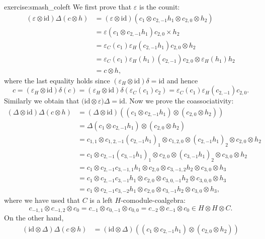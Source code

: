 \begin{sol}{exercise:smash_coleft}
We first prove that $\varepsilon$ is the counit:
\begin{align*}
(\varepsilon\otimes\textrm{id})\Delta(c\otimes h) & =(\varepsilon\otimes\textrm{id})(c_{1}\otimes c_{2,-1}h_{1}\otimes c_{2,0}\otimes h_{2})\\
 & =\varepsilon(c_{1}\otimes c_{2,-1}h_{1})c_{2,0}\times h_{2}\\
 & =\varepsilon_{C}(c_{1})\varepsilon_{H}(c_{2,-1}h_{1})c_{2,0}\otimes h_{2}\\
 & =\varepsilon_{C}(c_{1})\varepsilon_{H}(h_{1})(c_{2,-1})c_{2,0}\otimes\varepsilon_{H}(h_{1})h_{2}\\
 & =c\otimes h,
\end{align*}
where the last equality holds since $(\varepsilon_{H}\otimes\textrm{id})\delta=\textrm{id}$
and hence 
\[
c=(\varepsilon_{H}\otimes\textrm{id})\delta(c)=(\varepsilon_{H}\otimes\textrm{id})\delta(\varepsilon_{C}(c_{1})c_{2})=\varepsilon_{C}(c_{1})\varepsilon_{H}(c_{2,-1})c_{2,0}.
\]
Similarly we obtain that $\textrm{(id}\otimes\varepsilon)\Delta=\textrm{id}$.
Now we prove the coassociativity: 
\begin{align*}
(\Delta\otimes\textrm{id})\Delta(c\otimes h) & =(\Delta\otimes\textrm{id})((c_{1}\otimes c_{2,-1}h_{1})\otimes(c_{2,0}\otimes h_{2}))\\
 & =\Delta(c_{1}\otimes c_{2,-1}h_{1})\otimes(c_{2,0}\otimes h_{2})\\
 & =c_{1,1}\otimes c_{1,2,-1}(c_{2,-1}h_{1})_{1}\otimes c_{1,2,0}\otimes(c_{2,-1}h_{1})_{2}\otimes c_{2,0}\otimes h_{2}\\
 & =c_{1}\otimes c_{2,-1}(c_{3,-1}h_{1})_{1}\otimes c_{2,0}\otimes(c_{3,-1}h_{1})_{2}\otimes c_{3,0}\otimes h_{2}\\
 & =c_{1}\otimes c_{2,-1}c_{3,-1,1}h_{1}\otimes c_{2,0}\otimes c_{3,-1,2}h_{2}\otimes c_{3,0}\otimes h_{3}\\
 & =c_{1}\otimes c_{2,-1}c_{3,-1}h_{1}\otimes c_{2,0}\otimes c_{3,0,-1}h_{2}\otimes c_{3,0,0}\otimes h_{3}\\
 & =c_{1}\otimes c_{2,-1}c_{3,-2}h_{1}\otimes c_{2,0}\otimes c_{3,-1}h_{2}\otimes c_{3,0}\otimes h_{3},
\end{align*}
where we have used that $C$ is a left $H$-comodule-coalgebra: 
\[
c_{-1,1}\otimes c_{-1,2}\otimes c_{0}=c_{-1}\otimes c_{0,-1}\otimes c_{0,0}=c_{-2}\otimes c_{-1}\otimes c_{0}\in H\otimes H\otimes C.
\]
On the other hand, 
\begin{align*}
(\textrm{id}\otimes\Delta)\Delta(c\otimes h) & =(\textrm{id}\otimes\Delta)((c_{1}\otimes c_{2,-1}h_{1})\otimes(c_{2,0}\otimes h_{2}))\\

\end{align*}
\end{sol}
